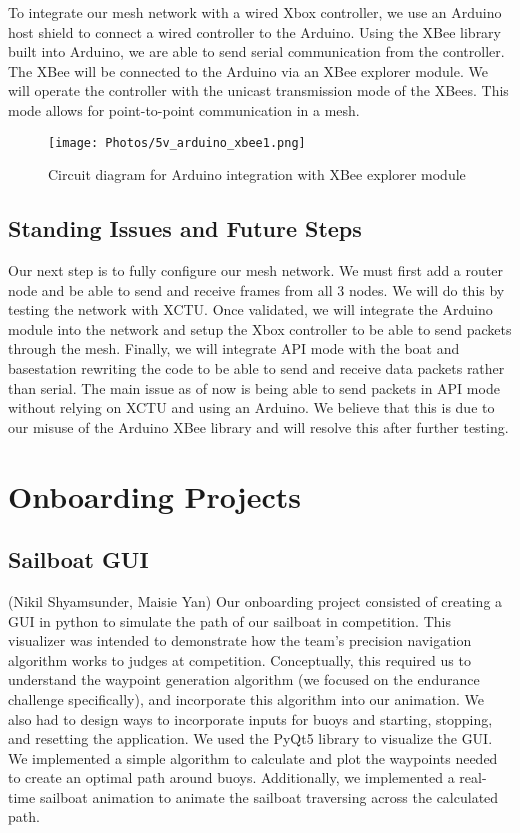 \documentclass{article}
\begin{document}
To integrate our mesh network with a wired Xbox controller, we use an Arduino host shield to connect a wired controller to the Arduino. Using the XBee library built into Arduino, we are able to send serial communication from the controller. The XBee will be connected to the Arduino via an XBee explorer module. We will operate the controller with the unicast transmission mode of the XBees. This mode allows for point-to-point communication in a mesh.
\begin{figure}[htp]
    \centering
    \texttt{[image: Photos/5v\_arduino\_xbee1.png]}
    \caption{Circuit diagram for Arduino integration with XBee explorer module}
    \label{Photos/fig:5v_arduino_xbee1.png}
\end{figure}
\subsection{Standing Issues and Future Steps}
 Our next step is to fully configure our mesh network. We must first add a router node and be able to send and receive frames from all 3 nodes. We will do this by testing the network with XCTU. Once validated, we will integrate the Arduino module into the network and setup the Xbox controller to be able to send packets through the mesh. Finally, we will integrate API mode with the boat and basestation rewriting the code to be able to send and receive data packets rather than serial. The main issue as of now is being able to send packets in API mode without relying on XCTU and using an Arduino. We believe that this is due to our misuse of the Arduino XBee library and will resolve this after further testing.
\newline

\section{Onboarding Projects}
\subsection {Sailboat GUI}
(Nikil Shyamsunder, Maisie Yan)
\newline
Our onboarding project consisted of creating a GUI in python to simulate the path of our sailboat in competition. This visualizer was intended to demonstrate how the team's precision navigation algorithm works to judges at competition. Conceptually, this required us to understand the waypoint generation algorithm (we focused on the endurance challenge specifically), and incorporate this algorithm into our animation. We also had to design ways to incorporate inputs for buoys and starting, stopping, and resetting the application. We used the PyQt5 library to visualize the GUI. We implemented a simple algorithm to calculate and plot the waypoints needed to create an optimal path around buoys. Additionally, we implemented a real-time sailboat animation to animate the sailboat traversing across the calculated path. 
\end{document}
